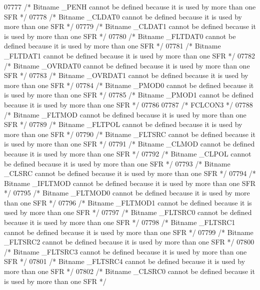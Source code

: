 \begin{DoxyCode}
07777 \textcolor{comment}{/* Bitname \_PENH cannot be defined because it is used by more than one SFR */}
07778 \textcolor{comment}{/* Bitname \_CLDAT0 cannot be defined because it is used by more than one SFR */}
07779 \textcolor{comment}{/* Bitname \_CLDAT1 cannot be defined because it is used by more than one SFR */}
07780 \textcolor{comment}{/* Bitname \_FLTDAT0 cannot be defined because it is used by more than one SFR */}
07781 \textcolor{comment}{/* Bitname \_FLTDAT1 cannot be defined because it is used by more than one SFR */}
07782 \textcolor{comment}{/* Bitname \_OVRDAT0 cannot be defined because it is used by more than one SFR */}
07783 \textcolor{comment}{/* Bitname \_OVRDAT1 cannot be defined because it is used by more than one SFR */}
07784 \textcolor{comment}{/* Bitname \_PMOD0 cannot be defined because it is used by more than one SFR */}
07785 \textcolor{comment}{/* Bitname \_PMOD1 cannot be defined because it is used by more than one SFR */}
07786 
07787 \textcolor{comment}{/* FCLCON3 */}
07788 \textcolor{comment}{/* Bitname \_FLTMOD cannot be defined because it is used by more than one SFR */}
07789 \textcolor{comment}{/* Bitname \_FLTPOL cannot be defined because it is used by more than one SFR */}
07790 \textcolor{comment}{/* Bitname \_FLTSRC cannot be defined because it is used by more than one SFR */}
07791 \textcolor{comment}{/* Bitname \_CLMOD cannot be defined because it is used by more than one SFR */}
07792 \textcolor{comment}{/* Bitname \_CLPOL cannot be defined because it is used by more than one SFR */}
07793 \textcolor{comment}{/* Bitname \_CLSRC cannot be defined because it is used by more than one SFR */}
07794 \textcolor{comment}{/* Bitname \_IFLTMOD cannot be defined because it is used by more than one SFR */}
07795 \textcolor{comment}{/* Bitname \_FLTMOD0 cannot be defined because it is used by more than one SFR */}
07796 \textcolor{comment}{/* Bitname \_FLTMOD1 cannot be defined because it is used by more than one SFR */}
07797 \textcolor{comment}{/* Bitname \_FLTSRC0 cannot be defined because it is used by more than one SFR */}
07798 \textcolor{comment}{/* Bitname \_FLTSRC1 cannot be defined because it is used by more than one SFR */}
07799 \textcolor{comment}{/* Bitname \_FLTSRC2 cannot be defined because it is used by more than one SFR */}
07800 \textcolor{comment}{/* Bitname \_FLTSRC3 cannot be defined because it is used by more than one SFR */}
07801 \textcolor{comment}{/* Bitname \_FLTSRC4 cannot be defined because it is used by more than one SFR */}
07802 \textcolor{comment}{/* Bitname \_CLSRC0 cannot be defined because it is used by more than one SFR */}

\end{DoxyCode}
